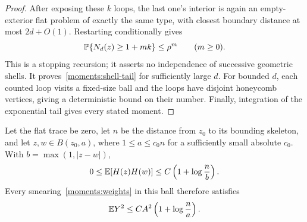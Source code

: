 \begin{proof}
After exposing these $k$ loops, the last one's interior is again an
empty-exterior flat problem of exactly the same type, with closest
boundary distance at most $2d+O(1)$.  Restarting conditionally gives
\[
 \mathbb P\{N_d(z)\geq1+mk\}\leq\rho^m\qquad(m\geq0).
\]
This is a stopping recursion; it asserts no independence of successive
geometric shells.  It proves~\eqref{moments:shell-tail} for sufficiently
large $d$.  For bounded $d$, each counted loop visits a fixed-size ball
and the loops have disjoint honeycomb vertices, giving a deterministic
bound on their number.  Finally, integration of the exponential tail
gives every stated moment.
\end{proof}

\begin{lemma}
\label{moments:covariance}
Let the flat trace be zero, let $n$ be the distance from $z_0$ to its
bounding skeleton, and let $z,w\in B(z_0,a)$, where
$1\leq a\leq c_0n$ for a sufficiently small absolute $c_0$.  With
$b=\max(1,|z-w|)$,
\begin{equation}\label{moments:covariance-bound}
 0\leq\mathbb E[H(z)H(w)]
 \leq C\left(1+\log\frac{n}{b}\right).
\end{equation}
Every smearing~\eqref{moments:weights} in this ball therefore satisfies
\begin{equation}\label{moments:second-moment}
 \mathbb E Y^2\leq C A^2\left(1+\log\frac{n}{a}\right).
\end{equation}
\end{lemma}

